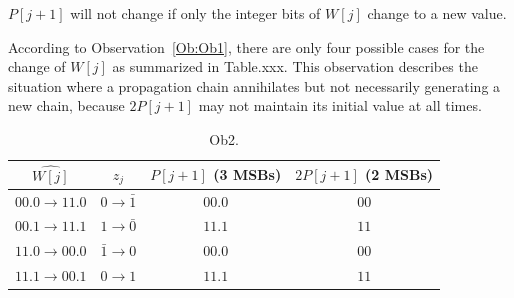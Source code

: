 \documentclass[a4paper, 11pt]{article}
\newtheorem{Ob}{\hskip\parindent\bf{Observation}}[]
\begin{document}
\begin{Ob}\label{Ob:Ob2}
    $P[j+1]$ will not change if only the integer bits of $W[j]$ change to a new value.
\end{Ob}

According to Observation~\ref{Ob:Ob1}, there are only four possible cases for the change of $W[j]$ as summarized in Table.xxx. This observation describes the situation where a propagation chain annihilates but not necessarily generating a new chain, because $2P[j+1]$ may not maintain its initial value at all times.
%
\begin{table}[htbp]
\caption{Ob2.}
\centering
\begin{tabular}{c|ccc}
\toprule
 $\widehat{W[j]}$ & $z_j$ & $P[j+1]$ (3 MSBs)  & $2P[j+1]$ (2 MSBs) \\ \midrule
 $00.0\rightarrow11.0$ & $0\rightarrow\bar{1}$ & $00.0$ & $00$\\
 $00.1\rightarrow11.1$ & $1\rightarrow\bar{0}$ & $11.1$ & $11$\\
 $11.0\rightarrow00.0$ & $\bar{1}\rightarrow0$ & $00.0$ & $00$\\
 $11.1\rightarrow00.1$ & $0\rightarrow{1}$ & $11.1$ & $11$\\ \bottomrule
\end{tabular}
\label{Tab:Observation2}
\end{table}

\end{document}
